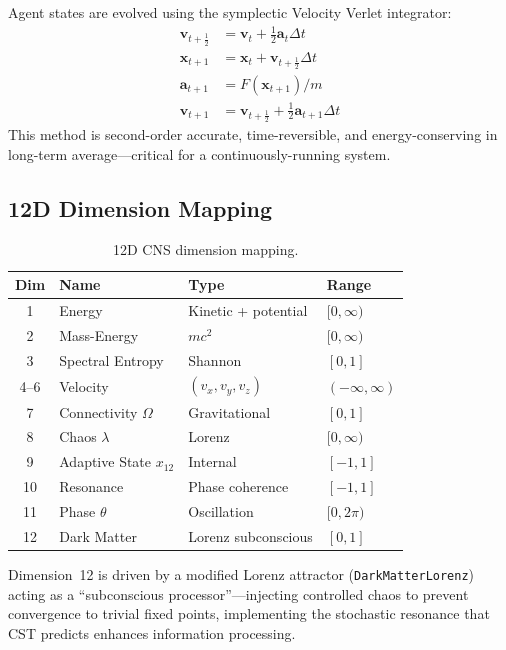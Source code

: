 \documentclass[11pt,a4paper]{article}
\begin{document}
Agent states are evolved using the symplectic Velocity Verlet integrator:
\begin{align}
    \mathbf{v}_{t+\frac{1}{2}} &= \mathbf{v}_t + \frac{1}{2}\mathbf{a}_t \Delta t \\
    \mathbf{x}_{t+1} &= \mathbf{x}_t + \mathbf{v}_{t+\frac{1}{2}} \Delta t \\
    \mathbf{a}_{t+1} &= F(\mathbf{x}_{t+1}) / m \\
    \mathbf{v}_{t+1} &= \mathbf{v}_{t+\frac{1}{2}} + \frac{1}{2}\mathbf{a}_{t+1} \Delta t
\end{align}
This method is second-order accurate, time-reversible, and energy-conserving in long-term average---critical for a continuously-running system.

\subsection{12D Dimension Mapping}

\begin{table}[h]
\centering
\caption{12D CNS dimension mapping.}
\label{tab:dims}
\begin{tabular}{clll}
\toprule
\textbf{Dim} & \textbf{Name} & \textbf{Type} & \textbf{Range} \\
\midrule
1 & Energy & Kinetic + potential & $[0, \infty)$ \\
2 & Mass-Energy & $mc^2$ & $[0, \infty)$ \\
3 & Spectral Entropy & Shannon & $[0, 1]$ \\
4--6 & Velocity & $(v_x, v_y, v_z)$ & $(-\infty, \infty)$ \\
7 & Connectivity $\Omega$ & Gravitational & $[0, 1]$ \\
8 & Chaos $\lambda$ & Lorenz & $[0, \infty)$ \\
9 & Adaptive State $x_{12}$ & Internal & $[-1, 1]$ \\
10 & Resonance & Phase coherence & $[-1, 1]$ \\
11 & Phase $\theta$ & Oscillation & $[0, 2\pi)$ \\
12 & Dark Matter & Lorenz subconscious & $[0, 1]$ \\
\bottomrule
\end{tabular}
\end{table}

Dimension~12 is driven by a modified Lorenz attractor (\texttt{DarkMatterLorenz}) acting as a ``subconscious processor''---injecting controlled chaos to prevent convergence to trivial fixed points, implementing the stochastic resonance that CST predicts enhances information processing.
\end{document}
